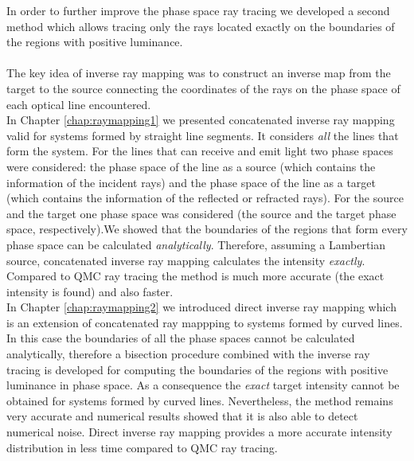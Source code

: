 In order to further improve the phase space ray tracing we developed a second method which allows tracing only the rays located exactly on the boundaries of the regions with positive luminance. 
\\ \\ \indent The key idea of inverse ray mapping was to construct an inverse map from the target to the source connecting the coordinates of the rays on the phase space of each optical line encountered. \\ \indent 
In Chapter \ref{chap:raymapping1} we presented concatenated inverse ray mapping valid for systems formed by straight line segments. It considers \textit{all} the lines that form the system. For the lines that can receive and emit light two phase spaces were considered: the phase space of the line as a source (which contains the information of the incident rays) and the phase space of the line as a target (which contains the information of the reflected or refracted rays). For the source and the target one phase space was considered (the source and the target phase space, respectively).We showed that the boundaries of the regions that form every phase space can be calculated \textit{analytically}. Therefore, assuming a Lambertian source, concatenated inverse ray mapping calculates the intensity \textit{exactly}. Compared to QMC ray tracing the method is much more accurate (the exact intensity is found) and also faster. \\\indent In Chapter \ref{chap:raymapping2} we introduced direct inverse ray mapping which is an extension of concatenated ray mappping to systems formed by curved lines. In this case the boundaries of all the phase spaces cannot be calculated analytically, therefore a bisection procedure combined with the inverse ray tracing is developed for computing the boundaries of the regions with positive luminance in phase space. As a consequence the \textit{exact} target intensity cannot be obtained for systems formed by curved lines. Nevertheless, the method remains very accurate and numerical results showed that it is also able to detect numerical noise. Direct inverse ray mapping provides a more accurate intensity distribution in less time compared to QMC ray tracing. \\ \indent 

